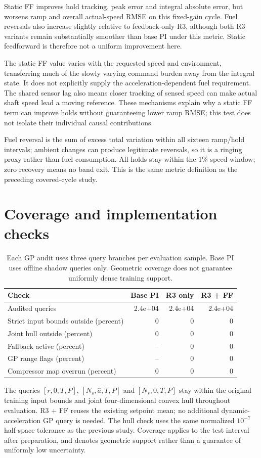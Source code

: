 \documentclass[11pt,a4paper]{article}
\begin{document}
Static FF improves hold tracking, peak error and integral absolute error, but worsens ramp and overall actual-speed RMSE on this fixed-gain cycle. Fuel reversals also increase slightly relative to feedback-only R3, although both R3 variants remain substantially smoother than base PI under this metric. Static feedforward is therefore not a uniform improvement here.

The static FF value varies with the requested speed and environment, transferring much of the slowly varying command burden away from the integral state. It does not explicitly supply the acceleration-dependent fuel requirement. The shared sensor lag also means closer tracking of sensed speed can make actual shaft speed lead a moving reference. These mechanisms explain why a static FF term can improve holds without guaranteeing lower ramp RMSE; this test does not isolate their individual causal contributions.

Fuel reversal is the sum of excess total variation within all sixteen ramp/hold intervals; ambient changes can produce legitimate reversals, so it is a ringing proxy rather than fuel consumption. All holds stay within the 1\% speed window; zero recovery means no band exit. This is the same metric definition as the preceding covered-cycle study.
\clearpage
\section{Coverage and implementation checks}
\begin{table}[H]\centering\small\begin{tabular}{lrrr}\toprule
Check & Base PI & R3 only & R3 + FF\\\midrule
Audited queries & 2.4e+04 & 2.4e+04 & 2.4e+04\\
Strict input bounds outside (percent) & 0 & 0 & 0\\
Joint hull outside (percent) & 0 & 0 & 0\\
Fallback active (percent) & -- & 0 & 0\\
GP range flags (percent) & -- & 0 & 0\\
Compressor map overrun (percent) & 0 & 0 & 0\\
\bottomrule\end{tabular}\caption{Each GP audit uses three query branches per evaluation sample. Base PI uses offline shadow queries only. Geometric coverage does not guarantee uniformly dense training support.}\end{table}
The queries $[r,0,T,P]$, $[N_s,\hat a,T,P]$ and $[N_s,0,T,P]$ stay within the original training input bounds and joint four-dimensional convex hull throughout evaluation. R3 + FF reuses the existing setpoint mean; no additional dynamic-acceleration GP query is needed. The hull check uses the same normalized $10^{-7}$ half-space tolerance as the previous study. Coverage applies to the test interval after preparation, and denotes geometric support rather than a guarantee of uniformly low uncertainty.
\end{document}
